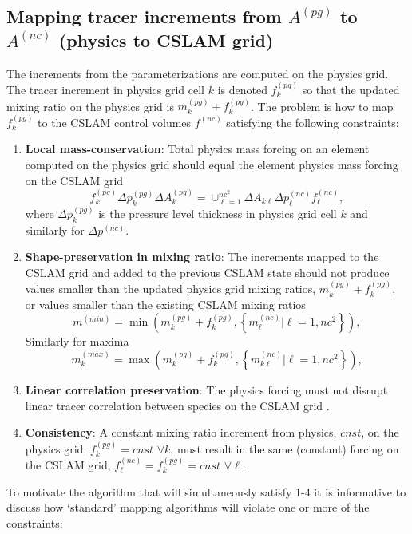 \subsection{Mapping tracer increments from $A^{(pg)}$ to $A^{(nc)}$ (physics to CSLAM grid)}\label{sec:pgtonc}
The increments from the parameterizations are computed on the physics grid. The tracer increment in physics grid cell $k$ is denoted $f_k^{(pg)}$ so that the updated mixing ratio on the physics grid is $m^{(pg)}_k+f_k^{(pg)}$. The problem is how to map $f_k^{(pg)}$ to the CSLAM control volumes $f^{(nc)}$ satisfying the following constraints:
\begin{enumerate}
\item {\bf{Local mass-conservation}}: Total physics mass forcing on an element computed on the physics grid should equal the element physics mass forcing on the CSLAM grid
\begin{equation}
f_k^{(pg)}\Delta p^{(pg)}_k\Delta A_k^{(pg)}=\cup_{\ell=1}^{nc^2}\Delta A_{k\ell}\Delta p^{(nc)}_\ell f^{(nc)}_\ell,
\end{equation}
where $\Delta p^{(pg)}_k$ is the pressure level thickness in physics grid cell $k$ and similarly for $\Delta p^{(nc)}$.
\item {\bf{Shape-preservation in mixing ratio}}: The increments mapped to the CSLAM grid and added to the previous CSLAM state should not produce values smaller than the updated physics grid mixing ratios, $m^{(pg)}_k+f_k^{(pg)}$, or values smaller than the existing CSLAM mixing ratios
\begin{equation}
m^{(min)}=\min \left( m^{(pg)}_k+f_k^{(pg)},\left\{ m^{(nc)}_{\ell} |\ell=1,nc^2\right\} \right),
\end{equation}
Similarly for maxima
\begin{equation}
m_k^{(max)}=\max \left( m^{(pg)}_k+f_k^{(pg)},\left\{ m^{(nc)}_{k\ell} |\ell=1,nc^2\right\} \right),
\end{equation}
\item {\bf{Linear correlation preservation}}: The physics forcing must not disrupt linear tracer correlation between species on the CSLAM grid \citep[see, e.g., ][]{LT2011QJR}.
\item {\bf{Consistency}}: A constant mixing ratio increment from physics, $cnst$, on the physics grid, $f_k^{(pg)}=cnst$ $\forall k$, must result in the same (constant) forcing on the CSLAM grid, $f_\ell^{(nc)}=f_k^{(pg)}=cnst$ $\forall \ell$.
\end{enumerate}
To motivate the algorithm that will simultaneously satisfy 1-4 it is informative to discuss how `standard' mapping algorithms will violate one or more of the constraints:
